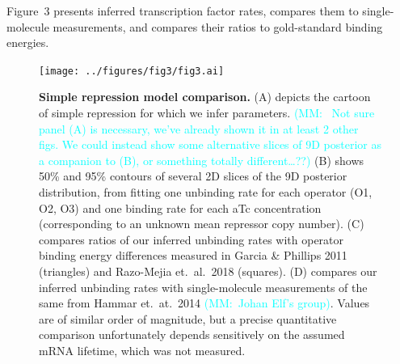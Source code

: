 \documentclass[12pt]{article}%
\newcommand{\mmnote}[1]{\textcolor{cyan}{(MM:~#1)}}
\begin{document}
Figure~3 presents inferred transcription factor rates, compares
them to single-molecule measurements, and compares their ratios
to gold-standard binding energies.
\begin{figure}%
\centering
\texttt{[image: ../figures/fig3/fig3.ai]}
\caption{\textbf{Simple repression model comparison.}
(A) depicts the cartoon of simple repression for which we infer parameters.
\mmnote{
Not sure panel (A) is necessary, we've already shown it in at least
2 other figs. We could instead show some alternative slices of 9D posterior
as a companion to (B), or something totally different\dots??}
(B) shows 50\% and 95\% contours of several 2D slices of the 9D posterior
distribution, from fitting one unbinding rate for each operator (O1, O2, O3)
and one binding rate for each aTc concentration (corresponding to an
unknown mean repressor copy number).
(C) compares ratios of our inferred unbinding rates with operator
binding energy differences measured in Garcia \& Phillips 2011 (triangles)
and Razo-Mejia et.\ al.\ 2018 (squares).
(D) compares our inferred unbinding rates with single-molecule measurements
of the same from Hammar et.\ at.\ 2014 \mmnote{Johan Elf's group}.
Values are of similar order of magnitude,
but a precise quantitative comparison unfortunately depends sensitively
on the assumed mRNA lifetime, which was not measured.
    }
\label{fig3:kR_inferences}
\end{figure}
\end{document}
